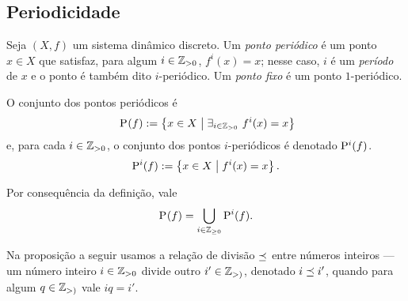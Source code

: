 \subsection{Periodicidade}

\begin{definition}
Seja $(X,f)$ um sistema dinâmico discreto. Um \emph{ponto periódico} é um ponto $x \in X$ que satisfaz, para algum $i \in \Z_{>0}$, $f^i(x)=x$; nesse caso, $i$ é um \emph{período} de $x$ e o ponto é também dito $i$-periódico. %
Um \emph{ponto fixo} é um ponto $1$-periódico.

O conjunto dos pontos periódicos é
	\begin{equation*}~
	\Per(f) := \set{x \in X}{\exists_{i \in \Z_{>0}}\ f^i(x)=x}
	\end{equation*}
e, para cada $i \in \Z_{>0}$, o conjunto dos pontos $i$-periódicos é denotado $\Per[i](f)$.
	\begin{equation*}
	\Per[i](f) := \set{x \in X}{f^i(x)=x}.
	\end{equation*}
\end{definition}

Por consequência da definição, vale
	\begin{equation*}
	\Per(f) = \bigcup_{i \in \Z_{\geq 0}} \Per[i](f).
	\end{equation*}

Na proposição a seguir usamos a relação de divisão $\dleq$ entre números inteiros --- um número inteiro $i \in \Z_{>0}$ divide outro $i' \in \Z_{>)}$, denotado $i \dleq i'$, quando para algum $q \in \Z_{>)}$ vale $iq=i'$.%

